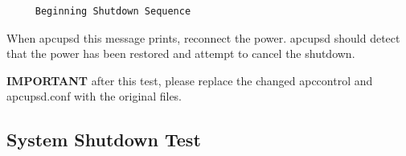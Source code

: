 \footnotesize
\begin{verbatim}
     Beginning Shutdown Sequence
\end{verbatim}
\normalsize

When apcupsd this message prints, reconnect the power.  apcupsd should detect
that the power has been restored and attempt to cancel the shutdown.  

{\bf IMPORTANT} after this test, please replace the changed apccontrol and
apcupsd.conf with the original files. 

\label{System-Shutdown-Test}

\subsection*{System Shutdown Test}

